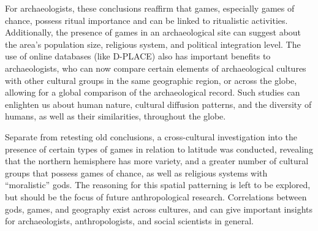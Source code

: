 \documentclass[%
	]{ijsra}
\begin{document}
For archaeologists, these conclusions reaffirm that games, especially games of chance, possess ritual importance and can be linked to ritualistic activities. Additionally, the presence of games in an archaeological site can suggest about the area’s population size, religious system, and political integration level. The use of online databases (like D-PLACE) also has important benefits to archaeologists, who can now compare certain elements of archaeological cultures with other cultural groups in the same geographic region, or across the globe, allowing for a global comparison of the archaeological record. Such studies can enlighten us about human nature, cultural diffusion patterns, and the diversity of humans, as well as their similarities, throughout the globe.

Separate from retesting old conclusions, a cross-cultural investigation into the presence of certain types of games in relation to latitude was conducted, revealing that the northern hemisphere has more variety, and a greater number of cultural groups that possess games of chance, as well as religious systems with “moralistic” gods. The reasoning for this spatial patterning is left to be explored, but should be the focus of future anthropological research. Correlations between gods, games, and geography exist across cultures, and can give important insights for archaeologists, anthropologists, and social scientists in general.

\IJSRAseparator


\IJSRAclosing%
\end{document}
